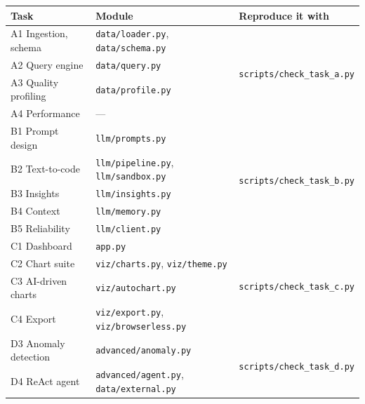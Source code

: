 \documentclass[11pt,a4paper]{article}
\begin{document}
\begin{center}
\small
\begin{tabularx}{\textwidth}{@{}llX@{}}
\toprule
\textbf{Task} & \textbf{Module} & \textbf{Reproduce it with} \\
\midrule
A1 Ingestion, schema   & \texttt{data/loader.py}, \texttt{data/schema.py} & \multirow{4}{*}{\texttt{scripts/check\_task\_a.py}} \\
A2 Query engine        & \texttt{data/query.py}          & \\
A3 Quality profiling   & \texttt{data/profile.py}        & \\
A4 Performance         & ---                             & \\
\addlinespace
B1 Prompt design       & \texttt{llm/prompts.py}         & \multirow{5}{*}{\texttt{scripts/check\_task\_b.py}} \\
B2 Text-to-code        & \texttt{llm/pipeline.py}, \texttt{llm/sandbox.py} & \\
B3 Insights            & \texttt{llm/insights.py}        & \\
B4 Context             & \texttt{llm/memory.py}          & \\
B5 Reliability         & \texttt{llm/client.py}          & \\
\addlinespace
C1 Dashboard           & \texttt{app.py}                 & \multirow{4}{*}{\texttt{scripts/check\_task\_c.py}} \\
C2 Chart suite         & \texttt{viz/charts.py}, \texttt{viz/theme.py} & \\
C3 AI-driven charts    & \texttt{viz/autochart.py}       & \\
C4 Export              & \texttt{viz/export.py}, \texttt{viz/browserless.py} & \\
\addlinespace
D3 Anomaly detection   & \texttt{advanced/anomaly.py}    & \multirow{2}{*}{\texttt{scripts/check\_task\_d.py}} \\
D4 ReAct agent         & \texttt{advanced/agent.py}, \texttt{data/external.py} & \\
\bottomrule
\end{tabularx}
\end{center}
\end{document}
